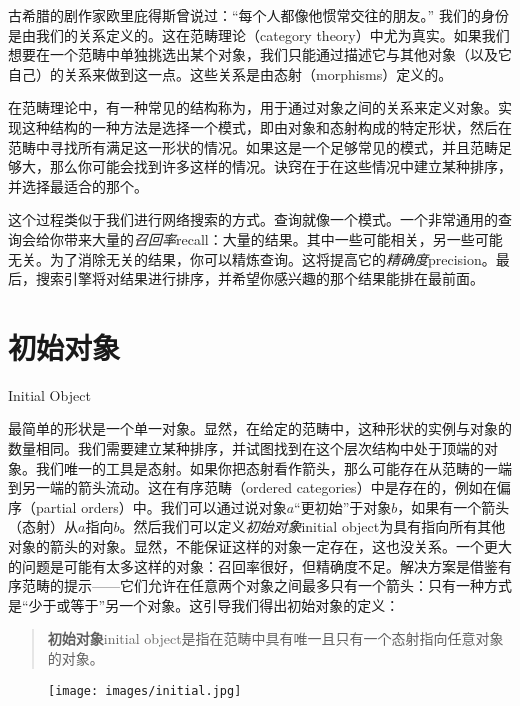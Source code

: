 
\lettrine[lhang=0.17]{古}{希腊的}剧作家欧里庇得斯曾说过：“每个人都像他惯常交往的朋友。” 我们的身份是由我们的关系定义的。这在范畴理论（category theory）中尤为真实。如果我们想要在一个范畴中单独挑选出某个对象，我们只能通过描述它与其他对象（以及它自己）的关系来做到这一点。这些关系是由态射（morphisms）定义的。

在范畴理论中，有一种常见的结构称为，用于通过对象之间的关系来定义对象。实现这种结构的一种方法是选择一个模式，即由对象和态射构成的特定形状，然后在范畴中寻找所有满足这一形状的情况。如果这是一个足够常见的模式，并且范畴足够大，那么你可能会找到许多这样的情况。诀窍在于在这些情况中建立某种排序，并选择最适合的那个。

这个过程类似于我们进行网络搜索的方式。查询就像一个模式。一个非常通用的查询会给你带来大量的\emph{召回率}{recall}：大量的结果。其中一些可能相关，另一些可能无关。为了消除无关的结果，你可以精炼查询。这将提高它的\emph{精确度}{precision}。最后，搜索引擎将对结果进行排序，并希望你感兴趣的那个结果能排在最前面。

\section{初始对象}{Initial Object}

最简单的形状是一个单一对象。显然，在给定的范畴中，这种形状的实例与对象的数量相同。我们需要建立某种排序，并试图找到在这个层次结构中处于顶端的对象。我们唯一的工具是态射。如果你把态射看作箭头，那么可能存在从范畴的一端到另一端的箭头流动。这在有序范畴（ordered categories）中是存在的，例如在偏序（partial orders）中。我们可以通过说对象$a$“更初始”于对象$b$，如果有一个箭头（态射）从$a$指向$b$。然后我们可以定义\emph{初始对象}{initial object}为具有指向所有其他对象的箭头的对象。显然，不能保证这样的对象一定存在，这也没关系。一个更大的问题是可能有太多这样的对象：召回率很好，但精确度不足。解决方案是借鉴有序范畴的提示——它们允许在任意两个对象之间最多只有一个箭头：只有一种方式是“少于或等于”另一个对象。这引导我们得出初始对象的定义：

\begin{quote}
  \textbf{初始对象}{initial object}是指在范畴中具有唯一且只有一个态射指向任意对象的对象。
\end{quote}

\begin{figure}[H]
  \centering
  \texttt{[image: images/initial.jpg]}
\end{figure}

